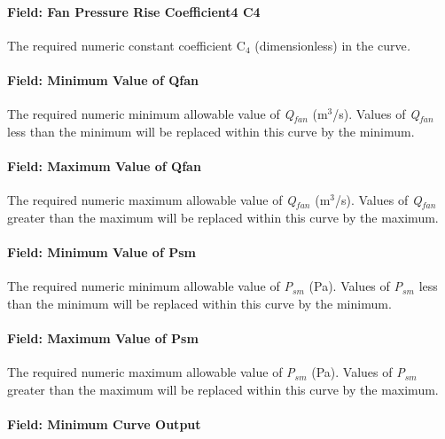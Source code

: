 \paragraph{Field: Fan Pressure Rise Coefficient4 C4}\label{field-fan-pressure-rise-coefficient4-c4}

The required numeric constant coefficient C\emph{\(_{4}\)} (dimensionless) in the curve\emph{.}

\paragraph{Field: Minimum Value of Qfan}\label{field-minimum-value-of-qfan}

The required numeric minimum allowable value of \emph{Q\(_{fan}\)} (m\(^{3}\)/s). Values of \emph{Q\(_{fan}\)} less than the minimum will be replaced within this curve by the minimum.

\paragraph{Field: Maximum Value of Qfan}\label{field-maximum-value-of-qfan}

The required numeric maximum allowable value of \emph{Q\(_{fan}\)} (m\(^{3}\)/s). Values of \emph{Q\(_{fan}\)} greater than the maximum will be replaced within this curve by the maximum.

\paragraph{Field: Minimum Value of Psm}\label{field-minimum-value-of-psm}

The required numeric minimum allowable value of \emph{P\(_{sm}\)} (Pa). Values of \emph{P\(_{sm}\)} less than the minimum will be replaced within this curve by the minimum.

\paragraph{Field: Maximum Value of Psm}\label{field-maximum-value-of-psm}

The required numeric maximum allowable value of \emph{P\(_{sm}\)} (Pa). Values of \emph{P\(_{sm}\)} greater than the maximum will be replaced within this curve by the maximum.

\paragraph{Field: Minimum Curve Output}\label{field-minimum-curve-output-11}

